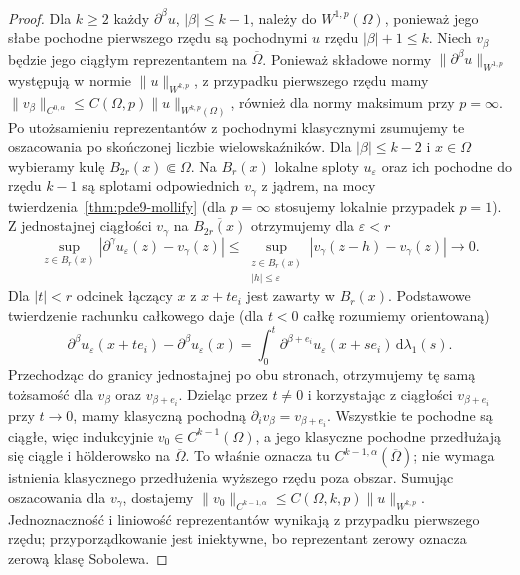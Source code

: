 \begin{proof}
Dla $k\ge2$ każdy $\partial^\beta u$, $|\beta|\le k-1$,
należy do $W^{1,p}(\Omega)$, ponieważ jego słabe
pochodne pierwszego rzędu są pochodnymi $u$ rzędu
$|\beta|+1\le k$. Niech $v_\beta$ będzie jego ciągłym
reprezentantem na $\overline\Omega$. Ponieważ składowe normy
$\|\partial^\beta u\|_{W^{1,p}}$ występują w normie
$\|u\|_{W^{k,p}}$, z przypadku pierwszego rzędu mamy
$\|v_\beta\|_{C^{0,\alpha}}\le
 C(\Omega,p)\|u\|_{W^{k,p}(\Omega)}$,
również dla normy maksimum przy $p=\infty$.
Po utożsamieniu reprezentantów z pochodnymi klasycznymi
zsumujemy te oszacowania po skończonej liczbie
wielowskaźników.
Dla $|\beta|\le k-2$ i $x\in\Omega$ wybieramy kulę
$B_{2r}(x)\Subset\Omega$. Na $B_r(x)$ lokalne sploty
$u_\varepsilon$ oraz ich pochodne do rzędu $k-1$
są splotami odpowiednich $v_\gamma$ z jądrem, na mocy
twierdzenia~\ref{thm:pde9-mollify} (dla $p=\infty$
stosujemy lokalnie przypadek $p=1$).
Z jednostajnej ciągłości $v_\gamma$ na
$\overline{B_{2r}(x)}$ otrzymujemy dla $\varepsilon<r$
\[
 \sup_{z\in B_r(x)}
 |\partial^\gamma u_\varepsilon(z)-v_\gamma(z)|
 \le\sup_{\substack{z\in B_r(x)\\|h|\le\varepsilon}}
 |v_\gamma(z-h)-v_\gamma(z)|\longrightarrow0.
\]
Dla $|t|<r$ odcinek łączący $x$ z $x+te_i$ jest
zawarty w $B_r(x)$. Podstawowe twierdzenie rachunku
całkowego daje (dla $t<0$ całkę rozumiemy orientowaną)
\[
 \partial^\beta u_\varepsilon(x+te_i)
 -\partial^\beta u_\varepsilon(x)
 =\int_0^t\partial^{\beta+e_i}u_\varepsilon(x+se_i)
             \,\mathrm d\lambda_1(s).
\]
Przechodząc do granicy jednostajnej po obu stronach,
otrzymujemy tę samą tożsamość dla $v_\beta$ oraz
$v_{\beta+e_i}$. Dzieląc przez $t\ne0$ i korzystając
z ciągłości $v_{\beta+e_i}$ przy $t\to0$, mamy
klasyczną pochodną $\partial_i v_\beta=v_{\beta+e_i}$.
Wszystkie te pochodne są ciągłe, więc indukcyjnie
$v_0\in C^{k-1}(\Omega)$, a jego klasyczne pochodne
przedłużają się ciągle i hölderowsko na
$\overline\Omega$. To właśnie oznacza tu
$C^{k-1,\alpha}(\overline\Omega)$; nie wymaga
istnienia klasycznego przedłużenia wyższego rzędu
poza obszar. Sumując oszacowania dla $v_\gamma$,
dostajemy
$\|v_0\|_{C^{k-1,\alpha}}\le
 C(\Omega,k,p)\|u\|_{W^{k,p}}$.
Jednoznaczność i liniowość reprezentantów wynikają
z przypadku pierwszego rzędu; przyporządkowanie
jest iniektywne, bo reprezentant zerowy oznacza
zerową klasę Sobolewa.
\end{proof}

